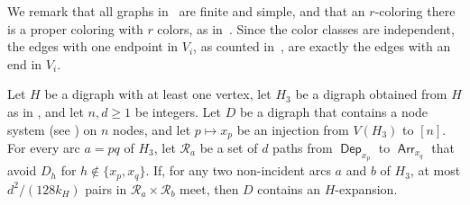 \documentclass[fontsize=12pt,leading=14pt]{fullpaper}
\DeclareMathOperator{\Arr}{\mathsf{Arr}}
\DeclareMathOperator{\Dep}{\mathsf{Dep}}
\newcommand{\Rcal}{\mathcal{R}}
\begin{document}
We remark that all graphs in~\cite{RW12} are finite and simple, and that an $r$-coloring there is a proper coloring with $r$ colors, as in~\cite[Chapter~5]{Diestel17}.
Since the color classes are independent, the edges with one endpoint in $V_i$, as counted in~\cite[Lemma~4.2]{RW12}, are exactly the edges with an end in $V_i$.

\begin{lemma}\label{cor:weight}
  Let $H$ be a digraph with at least one vertex, let $H_3$ be a digraph obtained from $H$ as in , and let $n,d\ge1$ be integers.
  Let $D$ be a digraph that contains a node system (see ) on $n$ nodes, and let $p\mapsto x_p$ be an injection from $V(H_3)$ to $[n]$.
  For every arc $a=pq$ of $H_3$, let $\Rcal_a$ be a set of $d$ paths from $\Dep_{x_p}$ to $\Arr_{x_q}$ that avoid $D_h$ for $h\notin\{x_p,x_q\}$.
  If, for any two non-incident arcs $a$ and $b$ of $H_3$, at most $d^2/(128k_H)$ pairs in $\Rcal_a\times\Rcal_b$ meet, then $D$ contains an $H$-expansion.
\end{lemma}
\end{document}
